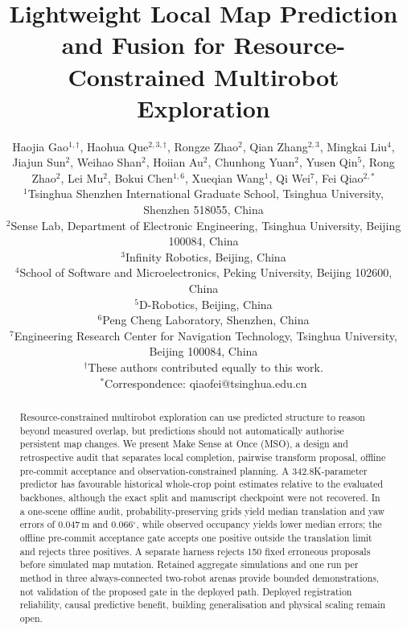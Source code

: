 \documentclass[11pt]{article}
\begin{document}
\title{Lightweight Local Map Prediction and Fusion for Resource-Constrained Multirobot Exploration}

\author{\parbox{0.95\textwidth}{\centering Haojia Gao$^{1,\dagger}$, Haohua Que$^{2,3,\dagger}$, Rongze Zhao$^{2}$,
Qian Zhang$^{2,3}$, Mingkai Liu$^{4}$, Jiajun Sun$^{2}$, Weihao Shan$^{2}$,
Hoiian Au$^{2}$, Chunhong Yuan$^{2}$, Yusen Qin$^{5}$, Rong Zhao$^{2}$,
Lei Mu$^{2}$, Bokui Chen$^{1,6}$, Xueqian Wang$^{1}$, Qi Wei$^{7}$,
Fei Qiao$^{2,*}$\\[0.75em]
\small $^{1}$Tsinghua Shenzhen International Graduate School, Tsinghua University, Shenzhen 518055, China\\
\small $^{2}$Sense Lab, Department of Electronic Engineering, Tsinghua University, Beijing 100084, China\\
\small $^{3}$Infinity Robotics, Beijing, China\\
\small $^{4}$School of Software and Microelectronics, Peking University, Beijing 102600, China\\
\small $^{5}$D-Robotics, Beijing, China\\
\small $^{6}$Peng Cheng Laboratory, Shenzhen, China\\
\small $^{7}$Engineering Research Center for Navigation Technology, Tsinghua University, Beijing 100084, China\\[0.5em]
\small $^{\dagger}$These authors contributed equally to this work.\\
\small $^{*}$Correspondence: qiaofei@tsinghua.edu.cn}}
\date{}

\maketitle

\begin{abstract}
Resource-constrained multirobot exploration can use predicted structure to reason beyond measured overlap, but predictions should not automatically authorise persistent map changes. We present Make Sense at Once (MSO), a design and retrospective audit that separates local completion, pairwise transform proposal, offline pre-commit acceptance and observation-constrained planning. A 342.8K-parameter predictor has favourable historical whole-crop point estimates relative to the evaluated backbones, although the exact split and manuscript checkpoint were not recovered. In a one-scene offline audit, probability-preserving grids yield median translation and yaw errors of 0.047\,m and 0.066$^{\circ}$, while observed occupancy yields lower median errors; the offline pre-commit acceptance gate accepts one positive outside the translation limit and rejects three positives. A separate harness rejects 150 fixed erroneous proposals before simulated map mutation. Retained aggregate simulations and one run per method in three always-connected two-robot arenas provide bounded demonstrations, not validation of the proposed gate in the deployed path. Deployed registration reliability, causal predictive benefit, building generalisation and physical scaling remain open.
\end{abstract}
\end{document}

